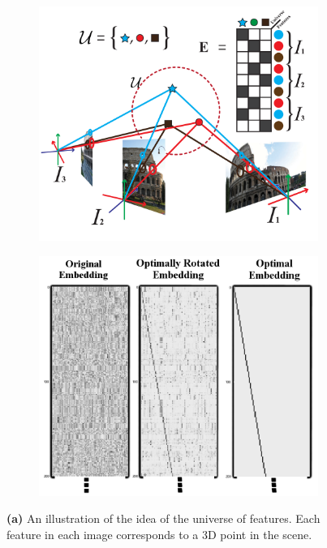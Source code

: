 \documentclass{article} %
\begin{document}
\begin{figure}[t]
\begin{subfigure}[b]{.45\linewidth}
  \centering
  \includegraphics[width=0.95\linewidth]{figures-UniverseOfFeatures-v2.pdf}
  \caption{}
  \label{fig:1a}
  \label{fig:universefeatures}
\end{subfigure}%
\begin{subfigure}[b]{.55\linewidth}
  \centering
  \includegraphics[width=0.75\linewidth]{figures-EmbeddingsViz.png}
  \caption{}
  \label{fig:1b}
  \label{fig:embeddingsviz}
\end{subfigure}
\caption{
  \textbf{(a)} An illustration of the idea of the universe of features.
  Each feature in each image corresponds to a 3D point in the scene.
}
\end{figure}
\end{document}
